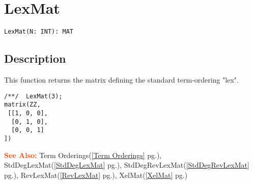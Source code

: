 \documentclass[a4paper]{mybook}
\newenvironment{command}{}{} %
\newcommand\SeeAlso{\par\textcolor{OrangeRed}{\textbf{\large See Also: }}}
\begin{document}
\section{LexMat}
\label{LexMat}
\begin{command} %


\begin{Verbatim}[label=syntax, rulecolor=\color{MidnightBlue},
frame=single]
LexMat(N: INT): MAT
\end{Verbatim}


\subsection*{Description}

This function returns the matrix defining the standard term-ordering "lex".
\begin{Verbatim}[label=example, rulecolor=\color{PineGreen}, frame=single]
/**/  LexMat(3);
matrix(ZZ,
 [[1, 0, 0],
  [0, 1, 0],
  [0, 0, 1]
])
\end{Verbatim}


\SeeAlso %
  Term Orderings(\ref{Term Orderings} pg.\pageref{Term Orderings}), 
    StdDegLexMat(\ref{StdDegLexMat} pg.\pageref{StdDegLexMat}), 
    StdDegRevLexMat(\ref{StdDegRevLexMat} pg.\pageref{StdDegRevLexMat}), 
    RevLexMat(\ref{RevLexMat} pg.\pageref{RevLexMat}), 
    XelMat(\ref{XelMat} pg.\pageref{XelMat})
\end{command} %
\end{document}

